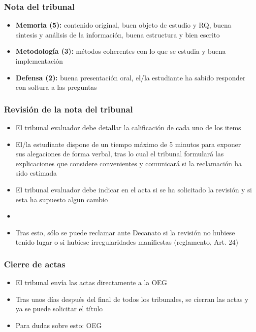 \documentclass[utf8, xcolor=dvipsnames]{beamer}
\begin{document}
\begin{frame}
\frametitle{Nota del tribunal}
\centering

\begin{itemize}
  \item \textbf{Memoria (5):} contenido original, buen objeto de estudio y RQ, buena síntesis y análisis de la información, buena estructura y bien escrito
  \item \textbf{Metodología (3):} métodos coherentes con lo que se estudia y buena implementación
  \item \textbf{Defensa (2):} buena presentación oral, el/la estudiante ha sabido responder con soltura a las preguntas
\end{itemize}

\end{frame}

\begin{frame}
\frametitle{Revisión de la nota del tribunal}
\centering

\begin{itemize}
  \item El tribunal evaluador debe detallar la calificación de cada uno de los items
  \item El/la estudiante dispone de un tiempo máximo de 5 minutos
  para exponer sus alegaciones de forma verbal, tras lo cual el tribunal formulará las
  explicaciones que considere convenientes y comunicará si la
  reclamación ha sido estimada
  \item El tribunal evaluador debe indicar en el acta si se ha solicitado la revisión y si esta ha supuesto algun cambio
  \item[]
  \item Tras esto, sólo se puede reclamar ante Decanato si la revisión no hubiese tenido lugar o si hubiese irregularidades manifiestas (reglamento, Art. 24)
\end{itemize}

\end{frame}

\begin{frame}
\frametitle{Cierre de actas}
\centering

\begin{itemize}
  \item El tribunal envía las actas directamente a la OEG
  \item Tras unos días después del final de todos los tribunales, se cierran las actas y ya se puede solicitar el título
  \item Para dudas sobre esto: OEG
\end{itemize}

\end{frame}
\end{document}
